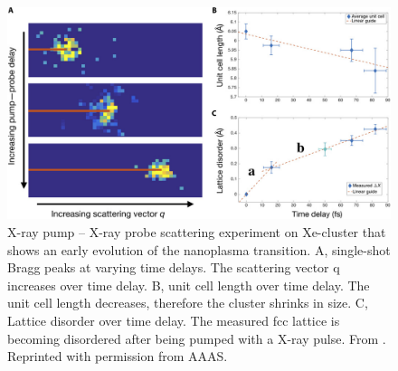 \begin{figure}
	\centering
		\includegraphics[width=1.00\textwidth]{images/ken-science.jpg}
	\caption[X-ray pump -- X-ray probe scattering experiment on Xe-cluster that shows an early evolution of the nanoplasma transition.]{X-ray pump -- X-ray probe scattering experiment on Xe-cluster that shows an early evolution of the nanoplasma transition. A, single-shot Bragg peaks at varying time delays. The scattering vector q increases over time delay. B, unit cell length over time delay. The unit cell length decreases, therefore the cluster shrinks in size. C, Lattice disorder over time delay. The measured fcc lattice is becoming disordered after being pumped with a X-ray pulse. From \citep{Ferguson-2016-SciAdv}. Reprinted with permission from AAAS.}
	\label{fig:ken-science}
\end{figure}
